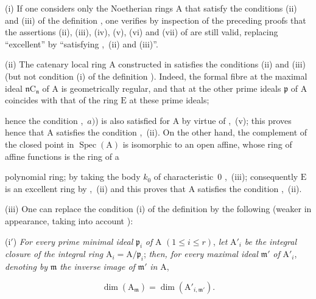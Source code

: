 \begin{remarks}[7.8.4]
\label{IV.7.8.4}
(i) If one considers only the Noetherian rings $\mathrm{A}$ that satisfy the conditions (ii) and (iii) of the definition , one verifies by inspection of the preceding proofs that the assertions (ii), (iii), (iv), (v), (vi) and (vii) of  are still valid, replacing ``excellent'' by ``satisfying ,~(ii) and (iii)''.

(ii) The catenary local ring $\mathrm{A}$ constructed in  satisfies the conditions (ii) and (iii) (but not condition (i) of the definition ). Indeed, the formal fibre at the maximal ideal $\mathfrak{n}\mathrm{C}_\mathfrak{n}$ of $\mathrm{A}$ is geometrically regular, and that at the other prime ideals $\mathfrak{p}$ of $\mathrm{A}$ coincides with that of the ring $\mathrm{E}$ at these prime ideals;


hence the condition ,~$a)$) is also satisfied for $\mathrm{A}$ by virtue of ,~(v); this proves hence that $\mathrm{A}$ satisfies the condition ,~(ii). On the other hand, the complement of the closed point in $\operatorname{Spec}(\mathrm{A})$ is isomorphic to an open affine, whose ring of affine functions is the ring of a

polynomial ring; by taking the body $k_0$ of characteristic~$0$ ,~(iii); consequently $\mathrm{E}$ is an excellent ring by ,~(ii) and this proves that $\mathrm{A}$ satisfies the condition ,~(ii).

(iii) One can replace the condition (i) of the definition  by the following (weaker in appearance, taking into account ):

(i$'$) \emph{For every prime minimal ideal} $\mathfrak{p}_i$ \emph{of} $\mathrm{A}$ $(1\leqslant i\leqslant r)$, \emph{let} $\mathrm{A}'_i$ \emph{be the integral closure of the integral ring} $\mathrm{A}_i=\mathrm{A}/\mathfrak{p}_i$; \emph{then, for every maximal ideal} $\mathfrak{m}'$ \emph{of} $\mathrm{A}'_i$, \emph{denoting by} $\mathfrak{m}$ \emph{the inverse image of} $\mathfrak{m}'$ \emph{in} $\mathrm{A}$,

\begin{env}[7.8.4.1]
\label{IV.7.8.4.1}
\[
  \dim(\mathrm{A}_\mathfrak{m})=\dim(\mathrm{A}'_{i,\mathfrak{m}'}).
\]
\end{env}


\end{remarks}
